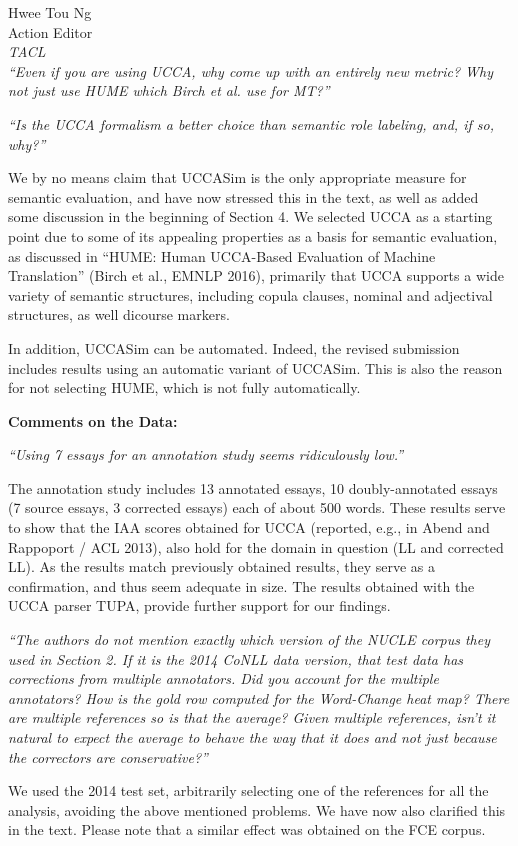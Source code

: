 \documentclass[11pt,letterpaper]{letter}
\begin{document}
\begin{letter}{%
Hwee Tou Ng\\
Action Editor\\
{\em TACL}\\
}
\emph{``Even if you are using UCCA, why come up with an entirely new metric? Why not just use HUME which Birch et al. use for MT?''}


\emph {``Is the UCCA formalism a better choice than semantic role labeling, and, if so, why?''}

We by no means claim that UCCASim is the only appropriate measure for semantic evaluation, and have now stressed this in the text, as well as added some discussion in the beginning of Section 4. We selected UCCA as a starting point due to some of its appealing properties as a basis for semantic evaluation, as discussed in ``HUME: Human UCCA-Based Evaluation of Machine Translation'' (Birch et al., EMNLP 2016), primarily that UCCA supports a wide variety of semantic structures, including copula clauses, nominal and adjectival structures, as well dicourse markers.

In addition, UCCASim can be automated. Indeed, the revised submission includes results using an automatic variant of UCCASim. This is also the reason for not selecting HUME, which is not fully automatically.


\vspace{.5cm}
{\large\bf Comments on the Data:}

\emph{``Using 7 essays for an annotation study seems ridiculously low.''}

The annotation study includes 13 annotated essays, 10 doubly-annotated essays (7 source essays, 3 corrected essays) each of about 500 words. These results serve to show that the IAA scores obtained for UCCA (reported, e.g., in Abend and Rappoport / ACL 2013), also hold for the domain in question (LL and corrected LL). As the results match previously obtained results, they serve as a confirmation, and thus seem adequate in size. The results obtained with the UCCA parser TUPA, provide further support for our findings.

\emph{``The authors do not mention exactly which version of the NUCLE corpus
	they used in Section 2. If it is the 2014 CoNLL data version, that test data
	has corrections from multiple annotators. Did you account for the multiple
	annotators? How is the gold row computed for the Word-Change heat map? There
	are multiple references so is that the average? Given multiple references,
	isn't it natural to expect the average to behave the way that it does and
	not just because the correctors are conservative?''}

We used the 2014 test set, arbitrarily selecting one of the references for all the analysis, avoiding the above mentioned problems. We have now also clarified this in the text. Please note that a similar effect was obtained on the FCE corpus.


\end{letter}
\end{document}

